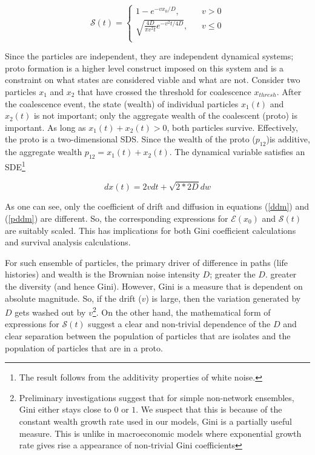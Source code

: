 \documentclass[sigconf]{acmart}
\begin{document}
\begin{equation}\label{s}
\mathcal{S}(t) = \begin{cases}
1 - e^{-v x_0/D}\text{, } & \text{ } v >0 \\
\sqrt{\frac{4D}{\pi v^2 t} e^{-v^2 t/4 D}}\text{, } & \text{ } v \leq 0 \\
\end{cases}
\end{equation}

Since the particles are independent, they are independent dynamical systems; proto formation is a higher level construct imposed on this system and is a constraint on what states are considered viable and what are not. Consider two particles $x_1$ and  $x_2$ that have crossed the threshold for coalescence $x_{thresh}$. After the coalescence event, the state (wealth) of individual particles $x_1(t)$ and  $x_2(t)$ is not important; only the aggregate wealth of the coalescent (proto) is important. As long as $x_1(t) + x_2(t) >0$, both particles survive. Effectively, the proto is a two-dimensional SDS. Since the wealth of the proto ($p_{12}$)is additive, the aggregate wealth $p_{12} = x_1(t) + x_2(t) $. The dynamical variable satisfies an SDE\footnote{The result follows from the additivity properties of white noise.}

\begin{equation}\label{pddm}
dx(t) = 2vdt + \sqrt{2*2D} dw
\end{equation}

As one can see, only the coefficient of drift and diffusion in equations (\ref{ddm}) and (\ref{pddm}) are different. So, the corresponding expressions for $\mathcal{E}(x_0)$ and $\mathcal{S}(t)$ are suitably scaled. This has implications for both Gini coefficient calculations and survival analysis calculations. 

For such ensemble of particles, the primary driver of difference in paths (life histories) and wealth is the Brownian noise intensity $D$; greater the $D$. greater the diversity (and hence Gini). However, Gini is a measure that is dependent on absolute magnitude. So,  if the drift ($v$) is large, then the variation generated by
$D$ gets washed out by $v$\footnote{Preliminary investigations suggest that for simple non-network ensembles, Gini either stays close to $0$ or $1$. We suspect that this is because of the constant wealth growth rate used in our models, Gini is a partially useful measure. This is unlike in macroeconomic models where exponential growth rate gives rise a appearance of non-trivial Gini coefficients}.  On the other hand, the mathematical form of expressions for $\mathcal{S}(t)$ suggest a clear and non-trivial dependence of the $D$ and clear separation between the population of particles that are isolates and the population of particles that are in a proto. 
\end{document}
